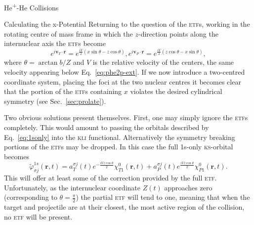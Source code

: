\documentclass[letterpaper, 11 pt]{report}
\begin{document}
\begin{chapter}{\texorpdfstring{He\textsuperscript{+}}{He+}-He Collisions \label{chap:hephe}}
\begin{section}{Calculating the x-Potential \label{sec:pot}}
      Returning to the question of the \textsc{etf}s, working in the rotating centre of mass frame in
      which the $z$-direction points along the internuclear axis the \textsc{etf}s become
      \begin{subequations} \label{eq:etf}
         \begin{equation} \label{eq:etfT}
            e^{i \mathbf{v}_T \cdot \mathbf{r}} =
             e^{\frac{i V}{2} (x \sin \theta - z \cos \theta)},
         \end{equation}
         \begin{equation} \label{eq:etfP}
            e^{i \mathbf{v}_P \cdot \mathbf{r}} =
             e^{\frac{i V}{2} (z \cos \theta - x \sin \theta)},
         \end{equation}
      \end{subequations}
      where $\theta = \arctan b/Z$ and $V$ is the relative velocity of the centers, the same velocity
      appearing below Eq.~\eqref{eq:phe2p-ext}. If we now introduce a two-centred coordinate system,
      placing the foci at the two nuclear centres it becomes clear that the portion of the \textsc{etf}s
      containing $x$ violates the desired cylindrical symmetry (see Sec.~\ref{sec:prolate}).

      Two obvious solutions present themselves. First, one may simply ignore the \textsc{etf}s
      completely. This would amount to passing the orbitals described by Eq.~\eqref{eq:1sonly} into
      the \textsc{kli} functional. Alternatively the symmetry breaking portions of the \textsc{etf}s
      may be dropped. In this case the full 1s-only \textsc{ks}-orbital becomes
      \begin{equation} \label{eq:1sonlyetf}
         \tilde{\varphi}_{\sigma j}^{1s} (\mathbf{r},t) =
                      a^{\sigma j}_T (t)  e^{-\frac{i V z \cos \theta}{2}} \chi^{0}_{T1} (\mathbf{r},t)
                    + a^{\sigma j}_P (t)  e^{ \frac{i V z \cos \theta}{2}} \chi^{0}_{P1} (\mathbf{r},t).
      \end{equation}
      This will offer at least some of the correction provided by the full \textsc{etf}. Unfortunately,
      as the internuclear coordinate $Z(t)$ approaches zero (corresponding to $\theta = \frac{\pi}{2}$)
      the partial \textsc{etf} will tend to one, meaning that when the target and projectile are at
      their closest, the most active region of the collision, no \textsc{etf} will be present.


\end{section}
\end{chapter}
\end{document}
